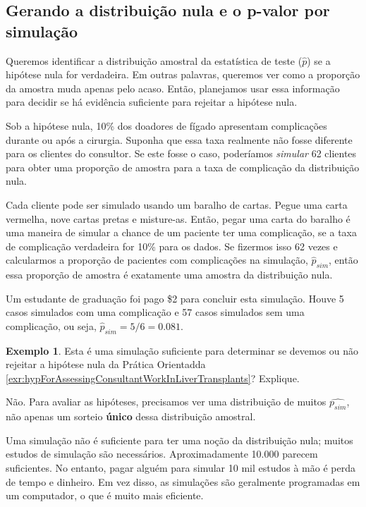 \documentclass[
]{book}
\theoremstyle{definition}
\theoremstyle{definition}
\newtheorem{example}{Exemplo}[chapter]
\theoremstyle{definition}
\theoremstyle{definition}
\theoremstyle{remark}
\begin{document}
\hypertarget{simulationNullDistribution}{%
\subsection{Gerando a distribuição nula e o p-valor por simulação}\label{simulationNullDistribution}}

Queremos identificar a distribuição amostral da estatística de teste (\(\hat{p}\)) se a hipótese nula for verdadeira. Em outras palavras, queremos ver como a proporção da amostra muda apenas pelo acaso. Então, planejamos usar essa informação para decidir se há evidência suficiente para rejeitar a hipótese nula.

Sob a hipótese nula, 10\% dos doadores de fígado apresentam complicações durante ou após a cirurgia. Suponha que essa taxa realmente não fosse diferente para os clientes do consultor. Se este fosse o caso, poderíamos \emph{simular} 62 clientes para obter uma proporção de amostra para a taxa de complicação da distribuição nula.

Cada cliente pode ser simulado usando um baralho de cartas. Pegue uma carta vermelha, nove cartas pretas e misture-as. Então, pegar uma carta do baralho é uma maneira de simular a chance de um paciente ter uma complicação, se a taxa de complicação verdadeira for 10\% para os dados. Se fizermos isso 62 vezes e calcularmos a proporção de pacientes com complicações na simulação, \(\hat{p}_{sim}\), então essa proporção de amostra é exatamente uma amostra da distribuição nula.

Um estudante de graduação foi pago \$2 para concluir esta simulação. Houve 5 casos simulados com uma complicação e 57 casos simulados sem uma complicação, ou seja, \(\hat{p}_{sim}=5/6 =0.081\).

\begin{example}
\protect\hypertarget{exm:unnamed-chunk-259}{}{\label{exm:unnamed-chunk-259} }Esta é uma simulação suficiente para determinar se devemos ou não rejeitar a hipótese nula da Prática Orientadda \ref{exr:hypForAssessingConsultantWorkInLiverTransplants}? Explique.
\end{example}

Não. Para avaliar as hipóteses, precisamos ver uma distribuição de muitos \(\hat{p _{sim}}\), não apenas um sorteio \textbf{único} dessa distribuição amostral.

Uma simulação não é suficiente para ter uma noção da distribuição nula; muitos estudos de simulação são necessários. Aproximadamente 10.000 parecem suficientes. No entanto, pagar alguém para simular 10 mil estudos à mão é perda de tempo e dinheiro. Em vez disso, as simulações são geralmente programadas em um computador, o que é muito mais eficiente.
\end{document}
